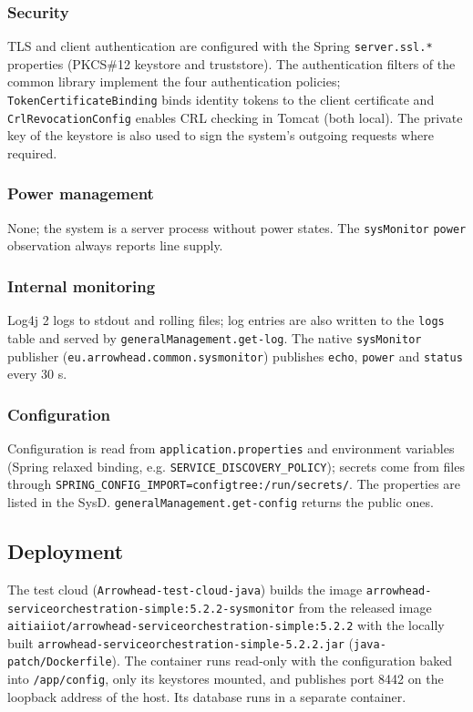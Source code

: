 \documentclass[a4paper]{arrowhead}
\begin{document}
\subsubsection{Security}

TLS and client authentication are configured with the Spring \texttt{server.ssl.*} properties (PKCS\#12 keystore and truststore). The authentication filters of the common library implement the four authentication policies; \texttt{TokenCertificateBinding} binds identity tokens to the client certificate and \texttt{CrlRevocationConfig} enables CRL checking in Tomcat (both local). The private key of the keystore is also used to sign the system's outgoing requests where required.

\subsubsection{Power management}

None; the system is a server process without power states. The \texttt{sysMonitor} \texttt{power} observation always reports line supply.

\subsubsection{Internal monitoring}

Log4j 2 logs to stdout and rolling files; log entries are also written to the \texttt{logs} table and served by \texttt{generalManagement.get-log}. The native \texttt{sysMonitor} publisher (\texttt{eu.arrowhead.common.sysmonitor}) publishes \texttt{echo}, \texttt{power} and \texttt{status} every 30 s.

\subsubsection{Configuration}

Configuration is read from \texttt{application.properties} and environment variables (Spring relaxed binding, e.g. \texttt{SERVICE\_DISCOVERY\_POLICY}); secrets come from files through \texttt{SPRING\_CONFIG\_IMPORT=configtree:/run/secrets/}. The properties are listed in the SysD. \texttt{generalManagement.get-config} returns the public ones.

\subsection{Deployment}

The test cloud (\texttt{Arrowhead-test-cloud-java}) builds the image \texttt{arrowhead-\allowbreak{}serviceorchestration-\allowbreak{}simple:5.\allowbreak{}2.\allowbreak{}2-\allowbreak{}sysmonitor} from the released image \texttt{aitiaiiot/\allowbreak{}arrowhead-\allowbreak{}serviceorchestration-\allowbreak{}simple:5.\allowbreak{}2.\allowbreak{}2} with the locally built \texttt{arrowhead-\allowbreak{}serviceorchestration-\allowbreak{}simple-\allowbreak{}5.\allowbreak{}2.\allowbreak{}2.\allowbreak{}jar} (\texttt{java-patch/Dockerfile}). The container runs read-only with the configuration baked into \texttt{/app/config}, only its keystores mounted, and publishes port 8442 on the loopback address of the host. Its database runs in a separate container.
\end{document}
